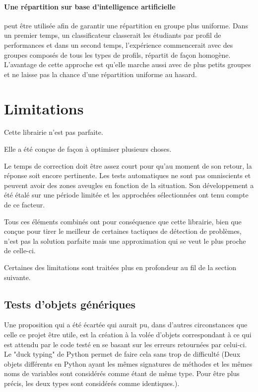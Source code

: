 \documentclass[a4paper]{report}
\begin{document}
\paragraph{Une répartition sur base d'intelligence artificielle} peut être utilisée afin de garantir une répartition en groupe plus uniforme.
Dans un premier temps, un classificateur classerait les étudiants par profil de performances \cite{Hormaux} et dans un second temps, l'expérience commencerait avec des groupes composés de tous les types de profils, répartit de façon homogène.
L'avantage de cette approche est qu'elle marche aussi avec de plus petits groupes et ne laisse pas la chance d'une répartition uniforme au hasard.


\section{Limitations}


\begin{center}
Cette librairie n'est pas parfaite.
\end{center}

Elle a été conçue de façon à optimiser plusieurs choses.

Le temps de correction doit être assez court pour qu’au moment de son retour, la réponse soit encore pertinente.
Les tests automatiques ne sont pas omniscients et peuvent avoir des zones aveugles en fonction de la situation.
Son développement a été étalé sur une période limitée et les approchées sélectionnées ont tenu compte de ce facteur.


Tous ces éléments combinés ont pour conséquence que cette librairie, bien que conçue pour tirer le meilleur de certaines tactiques de détection de problèmes, n'est pas la solution parfaite mais une approximation qui se veut le plus proche de celle-ci.

Certaines des limitations sont traitées plus en profondeur au fil de la section suivante.


\subsection{Tests d'objets génériques}
Une proposition qui  a été écartée qui aurait pu, dans d'autres circonstances que celle ce projet être utile, est la création à la volée d'objets correspondant à ce qui est  attendu par le code testé en se basant sur les erreurs retournées par celui-ci.
Le "duck typing" de Python permet de faire cela sans trop de difficulté (Deux objets différents en Python ayant les mêmes signatures de méthodes et  les mêmes noms de variables sont considérés comme étant de même type. Pour être plus précis, les deux types sont considérés comme identiques.).
\end{document}
